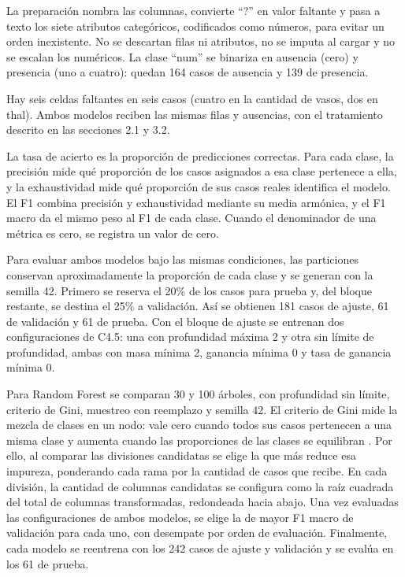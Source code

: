 \documentclass[runningheads]{llncs}
\begin{document}
La preparación nombra las columnas, convierte ``?'' en valor faltante y pasa a texto los siete atributos categóricos, codificados como números, para evitar un orden inexistente. No se descartan filas ni atributos, no se imputa al cargar y no se escalan los numéricos. La clase ``num'' se binariza en ausencia (cero) y presencia (uno a cuatro): quedan 164 casos de ausencia y 139 de presencia.

Hay seis celdas faltantes en seis casos (cuatro en la cantidad de vasos, dos en thal). Ambos modelos reciben las mismas filas y ausencias, con el tratamiento descrito en las secciones 2.1 y 3.2.

La tasa de acierto es la proporción de predicciones correctas. Para cada clase, la precisión mide qué proporción de los casos asignados a esa clase pertenece a ella, y la exhaustividad mide qué proporción de sus casos reales identifica el modelo. El F1 combina precisión y exhaustividad mediante su media armónica, y el F1 macro da el mismo peso al F1 de cada clase. Cuando el denominador de una métrica es cero, se registra un valor de cero.

Para evaluar ambos modelos bajo las mismas condiciones, las particiones conservan aproximadamente la proporción de cada clase y se generan con la semilla 42. Primero se reserva el 20\% de los casos para prueba y, del bloque restante, se destina el 25\% a validación. Así se obtienen 181 casos de ajuste, 61 de validación y 61 de prueba. Con el bloque de ajuste se entrenan dos configuraciones de C4.5: una con profundidad máxima 2 y otra sin límite de profundidad, ambas con masa mínima 2, ganancia mínima 0 y tasa de ganancia mínima 0.

Para Random Forest se comparan 30 y 100 árboles, con profundidad sin límite, criterio de Gini, muestreo con reemplazo y semilla 42. El criterio de Gini mide la mezcla de clases en un nodo: vale cero cuando todos sus casos pertenecen a una misma clase y aumenta cuando las proporciones de las clases se equilibran \cite{stanfordGini}. Por ello, al comparar las divisiones candidatas se elige la que más reduce esa impureza, ponderando cada rama por la cantidad de casos que recibe. En cada división, la cantidad de columnas candidatas se configura como la raíz cuadrada del total de columnas transformadas, redondeada hacia abajo. Una vez evaluadas las configuraciones de ambos modelos, se elige la de mayor F1 macro de validación para cada uno, con desempate por orden de evaluación. Finalmente, cada modelo se reentrena con los 242 casos de ajuste y validación y se evalúa en los 61 de prueba.
\end{document}
